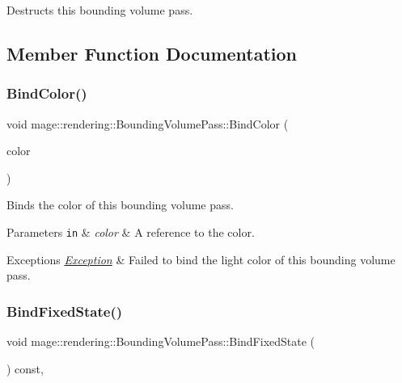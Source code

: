 Destructs this bounding volume pass. 

\subsection{Member Function Documentation}
\hypertarget{classmage_1_1rendering_1_1_bounding_volume_pass_a52c5852cfc290c5d07059537a26b71ea}{}\label{classmage_1_1rendering_1_1_bounding_volume_pass_a52c5852cfc290c5d07059537a26b71ea} 
\subsubsection{\texorpdfstring{Bind\+Color()}{BindColor()}}
{\footnotesize\ttfamily void mage\+::rendering\+::\+Bounding\+Volume\+Pass\+::\+Bind\+Color (\begin{DoxyParamCaption}\item[{const \hyperlink{structmage_1_1_r_g_b_a}{R\+G\+BA} \&}]{color }\end{DoxyParamCaption})\hspace{0.3cm}{\ttfamily [private]}}

Binds the color of this bounding volume pass.


\begin{DoxyParams}[1]{Parameters}
\mbox{\tt in}  & {\em color} & A reference to the color. \\
\hline
\end{DoxyParams}

\begin{DoxyExceptions}{Exceptions}
{\em \hyperlink{classmage_1_1_exception}{Exception}} & Failed to bind the light color of this bounding volume pass. \\
\hline
\end{DoxyExceptions}
\hypertarget{classmage_1_1rendering_1_1_bounding_volume_pass_a117de59e78f7219b10795678eeacff34}{}\label{classmage_1_1rendering_1_1_bounding_volume_pass_a117de59e78f7219b10795678eeacff34} 
\subsubsection{\texorpdfstring{Bind\+Fixed\+State()}{BindFixedState()}}
{\footnotesize\ttfamily void mage\+::rendering\+::\+Bounding\+Volume\+Pass\+::\+Bind\+Fixed\+State (\begin{DoxyParamCaption}{ }\end{DoxyParamCaption}) const\hspace{0.3cm}{\ttfamily [private]}, {\ttfamily [noexcept]}}

